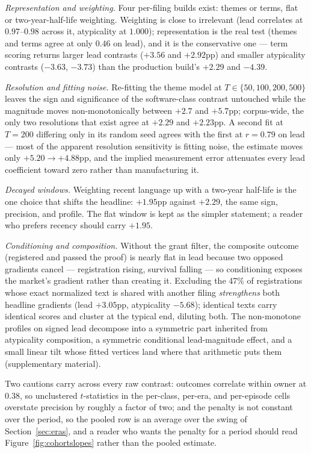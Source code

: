 \emph{Representation and weighting.} Four per-filing builds exist: themes
or terms, flat or two-year-half-life weighting. Weighting is close to
irrelevant (lead correlates at $0.97$--$0.98$ across it, atypicality at
$1.000$); representation is the real test (themes and terms agree at only
$0.46$ on lead), and it is the conservative one --- term scoring returns
larger lead contrasts ($+3.56$ and $+2.92$pp) and smaller atypicality
contrasts ($-3.63$, $-3.73$) than the production build's $+2.29$ and
$-4.39$.

\emph{Resolution and fitting noise.} Re-fitting the theme model at
$T \in \{50, 100, 200, 500\}$ leaves the sign and significance of the
software-class contrast untouched while the magnitude moves
non-monotonically between $+2.7$ and $+5.7$pp; corpus-wide, the only two
resolutions that exist agree at $+2.29$ and $+2.23$pp. A second fit at
$T = 200$ differing only in its random seed agrees with the first at
$r = 0.79$ on lead --- most of the apparent resolution sensitivity is
fitting noise, the estimate moves only $+5.20 \to +4.88$pp, and the
implied measurement error attenuates every lead coefficient toward zero
rather than manufacturing it.

\emph{Decayed windows.} Weighting recent language up with a two-year
half-life is the one choice that shifts the headline: $+1.95$pp against
$+2.29$, the same sign, precision, and profile. The flat window is kept
as the simpler statement; a reader who prefers recency should carry
$+1.95$.

\emph{Conditioning and composition.}\label{sec:robust_uncond} Without the
grant filter, the composite outcome (registered and passed the proof) is
nearly flat in lead because two opposed gradients cancel --- registration
rising, survival falling --- so conditioning exposes the market's
gradient rather than creating it. Excluding the 47\% of registrations
whose exact normalized text is shared with another filing
\emph{strengthens} both headline gradients (lead $+3.05$pp, atypicality
$-5.68$); identical texts carry identical scores and cluster at the
typical end, diluting both. The non-monotone profiles on signed lead
decompose into a symmetric part inherited from atypicality composition, a
symmetric conditional lead-magnitude effect, and a small linear tilt
whose fitted vertices land where that arithmetic puts them (supplementary
material).

Two cautions carry across every raw contrast: outcomes correlate within
owner at $0.38$, so unclustered $t$-statistics in the per-class, per-era,
and per-episode cells overstate precision by roughly a factor of two; and
the penalty is not constant over the period, so the pooled row is an
average over the swing of Section~\ref{sec:eras}, and a reader who wants
the penalty for a period should read Figure~\ref{fig:cohortslopes}
rather than the pooled estimate.
